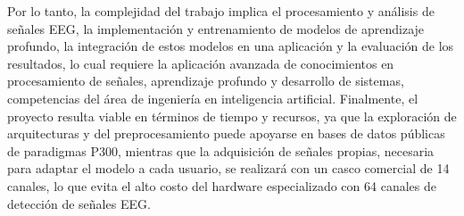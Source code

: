 Por lo tanto, la complejidad del trabajo implica el procesamiento y análisis de señales EEG, la
implementación y entrenamiento de modelos de aprendizaje profundo, la integración de estos
modelos en una aplicación y la evaluación de los resultados, lo cual requiere la aplicación
avanzada de conocimientos en procesamiento de señales, aprendizaje profundo y desarrollo de
sistemas, competencias del área de ingeniería en inteligencia artificial. Finalmente, el
proyecto resulta viable en términos de tiempo y recursos, ya que la exploración de
arquitecturas y del preprocesamiento puede apoyarse en bases de datos públicas de paradigmas P300,
mientras que la adquisición de señales propias, necesaria para adaptar el modelo a cada usuario, se
realizará con un casco comercial de 14 canales, lo que evita el alto costo del hardware especializado
con 64 canales de detección de señales EEG.
